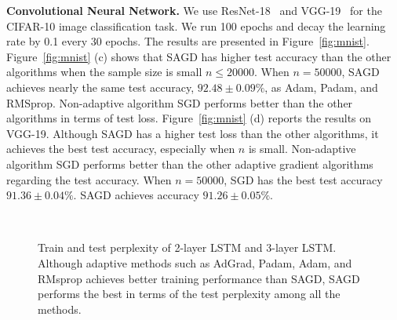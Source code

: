 \documentclass[11pt]{article}
\begin{document}
\textbf{Convolutional Neural Network.}
We use ResNet-18~\citep{hezh2016} and VGG-19~\citep{sizi2014} for the CIFAR-10 image classification task. We run 100 epochs and decay the learning rate by 0.1 every 30 epochs. 
The results are presented in Figure~\ref{fig:mnist}. 
Figure~\ref{fig:mnist} (c) shows that \textsc{SAGD} has higher test accuracy than the 
other algorithms when the sample size is small \ie $n \leq 20000$.
When $n = 50000$, \textsc{SAGD} achieves nearly the same test accuracy, $92.48 \pm 0.09\%$,  as Adam, Padam, and RMSprop.
Non-adaptive algorithm 
SGD performs better than the other algorithms in terms of test loss. 
Figure~\ref{fig:mnist} (d) reports the results on VGG-19. Although \textsc{SAGD} has a higher test loss than the other algorithms, it achieves the best test accuracy, especially when $n$ is small. Non-adaptive algorithm SGD performs better than the other adaptive gradient algorithms regarding the test accuracy.
When $n= 50000$, SGD has the best test accuracy $91.36 \pm 0.04\%$. \textsc{SAGD} achieves accuracy $91.26 \pm 0.05\%$.

\begin{figure}[t] 
 \mbox{
}
 \vspace{-0.1in}
 \caption[]{Train and test perplexity of 2-layer LSTM and 3-layer LSTM. 
 Although adaptive methods such as AdGrad, Padam, Adam, and RMsprop achieves better training performance than \textsc{SAGD}, \textsc{SAGD} performs the best in terms of the test perplexity among all the methods.
} 
 \label{fig:cifar10}\vspace{-0.05in}
\end{figure}
\end{document}
